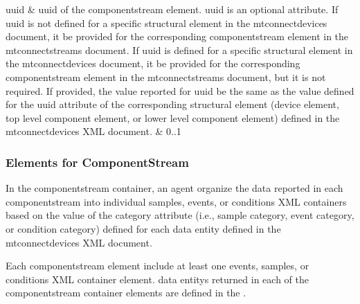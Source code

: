\documentclass{mtconnect}	%
\begin{document}
\begin{longtabu}
\gls{uuid}
&
\gls{uuid} of the \gls{componentstream} element.
\newline \gls{uuid} is an optional attribute.
\newline If \gls{uuid} is not defined for a specific \gls{structural element} in the
\gls{mtconnectdevices} document, it \MUSTNOT be provided for the
corresponding \gls{componentstream} element in the
\gls{mtconnectstreams} document.
\newline If \gls{uuid} is defined for a specific \gls{structural element} in the
\gls{mtconnectdevices} document, it \MAY be provided for the
corresponding \gls{componentstream} element in the
\gls{mtconnectstreams} document, but it is not required.
\newline If provided, the value reported for \gls{uuid} \MUST be the same as the
value defined for the \gls{uuid} attribute of the corresponding \gls{structural element} (\gls{device} element, \gls{top level} \gls{component} element, or \gls{lower level} \gls{component} element) defined in the \gls{mtconnectdevices}
XML document.
&
0..1 \\
\hline


\end{longtabu}

\subsubsection{Elements for ComponentStream}

In the \gls{componentstream} container, an \gls{agent} \must organize the data reported in each \gls{componentstream} into individual \gls{samples}, \gls{events}, or \gls{conditions} XML containers based on the value of the \gls{category} attribute (i.e., \gls{sample category}, \gls{event category}, or \gls{condition category}) defined for each \gls{data entity} defined in the \gls{mtconnectdevices} XML document.

Each \gls{componentstream} element \must include at least one \gls{events}, \gls{samples}, or \gls{conditions} XML container element.   \glspl{data entity} returned in each of the \gls{componentstream} container elements are defined in the . 
\end{document}
